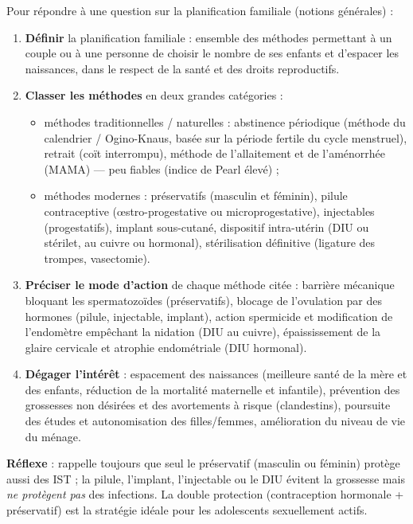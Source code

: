 \documentclass[11pt]{article}
\newcommand{\cle}[1]{{\popxbold\color{popdark}#1}}
\begin{document}
\begin{methode}
Pour répondre à une question sur la planification familiale (notions générales) :
\begin{enumerate}
\item \textbf{Définir} la planification familiale : ensemble des méthodes permettant à un couple ou à une personne de choisir le nombre de ses enfants et d'espacer les naissances, dans le respect de la santé et des droits reproductifs.
\item \textbf{Classer les méthodes} en deux grandes catégories :
\begin{itemize}
\item méthodes \cle{traditionnelles / naturelles} : abstinence périodique (méthode du calendrier / Ogino-Knaus, basée sur la période fertile du cycle menstruel), retrait (coït interrompu), méthode de l'allaitement et de l'aménorrhée (MAMA) — peu fiables (indice de Pearl élevé) ;
\item méthodes \cle{modernes} : préservatifs (masculin et féminin), pilule contraceptive (œstro-progestative ou microprogestative), injectables (progestatifs), implant sous-cutané, dispositif intra-utérin (DIU ou stérilet, au cuivre ou hormonal), stérilisation définitive (ligature des trompes, vasectomie).
\end{itemize}
\item \textbf{Préciser le mode d'action} de chaque méthode citée : barrière mécanique bloquant les spermatozoïdes (préservatifs), blocage de l'ovulation par des hormones (pilule, injectable, implant), action spermicide et modification de l'endomètre empêchant la nidation (DIU au cuivre), épaississement de la glaire cervicale et atrophie endométriale (DIU hormonal).
\item \textbf{Dégager l'intérêt} : espacement des naissances (meilleure santé de la mère et des enfants, réduction de la mortalité maternelle et infantile), prévention des grossesses non désirées et des avortements à risque (clandestins), poursuite des études et autonomisation des filles/femmes, amélioration du niveau de vie du ménage.
\end{enumerate}
\textbf{Réflexe} : rappelle toujours que seul le préservatif (masculin ou féminin) protège aussi des IST ; la pilule, l'implant, l'injectable ou le DIU évitent la grossesse mais \emph{ne protègent pas} des infections. La double protection (contraception hormonale + préservatif) est la stratégie idéale pour les adolescents sexuellement actifs.
\end{methode}
\end{document}

